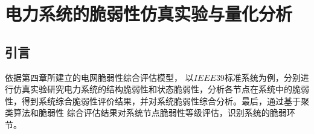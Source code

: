 \chapter{电力系统的脆弱性仿真实验与量化分析}
\label{cha:quantiAnaly}

\section{引言}
\label{sec:index5}
依据第四章所建立的电网脆弱性综合评估模型，
以$IEEE39$标准系统为例，分别进行仿真实验研究电力系统的结构脆弱性和状态脆弱性，分析各节点在系统中的脆弱性，得到系统综合脆弱性评价结果，并对系统脆弱性综合分析。最后，通过基于聚类算法和脆弱性
综合评估结果对系统节点脆弱性等级评估，识别系统的脆弱环节。




